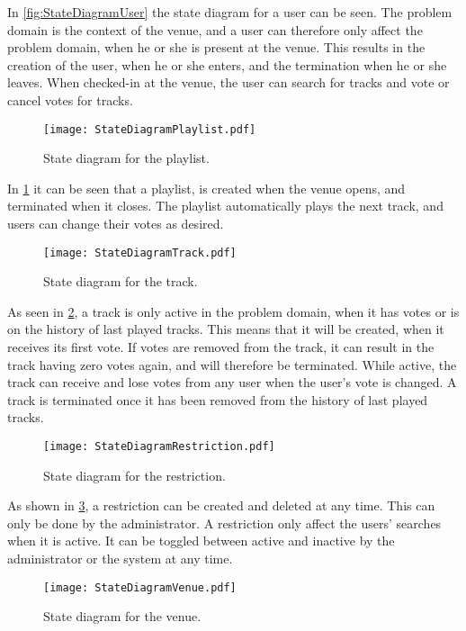In \cref{fig:StateDiagramUser} the state diagram for a user can be seen. The problem domain is the context of the venue, and a user can therefore only affect the problem domain, when he or she is present at the venue. This results in the creation of the user, when he or she enters, and the termination when he or she leaves. When checked-in at the venue, the user can search for tracks and vote or cancel votes for tracks.

\begin{figure}[H]
  \centering
  \texttt{[image: StateDiagramPlaylist.pdf]}
  \caption{State diagram for the playlist.}\label{fig:StateDiagramPlaylist}
\end{figure}

In \cref{fig:StateDiagramPlaylist} it can be seen that a playlist, is created when the venue opens, and terminated when it closes. The playlist automatically plays the next track, and users can change their votes as desired.

\begin{figure}[H]
  \centering
  \texttt{[image: StateDiagramTrack.pdf]}
  \caption{State diagram for the track.}\label{fig:StateDiagramTrack}
\end{figure}

As seen in \cref{fig:StateDiagramTrack}, a track is only active in
the problem domain, when it has votes or is on the history of last
played tracks. This means that it will be created, when it receives
its first vote. If votes are removed from the track, it can result in
the track having zero votes again, and will therefore be
terminated. While active, the track can receive and lose votes from
any user when the user's vote is changed. A track is terminated once it has
been removed from the history of last played tracks.

\begin{figure}[H]
  \centering
  \texttt{[image: StateDiagramRestriction.pdf]}
  \caption{State diagram for the restriction.}\label{fig:StateDiagramRestriction}
\end{figure}

As shown in \cref{fig:StateDiagramRestriction}, a restriction can be created and deleted at any time. This can only be done by the administrator. A restriction only affect the users' searches when it is active. It can be toggled between active and inactive by the administrator or the system at any time.

\begin{figure}[H]
  \centering
  \texttt{[image: StateDiagramVenue.pdf]}
  \caption{State diagram for the venue.}\label{fig:StateDiagramVenue}
\end{figure}

